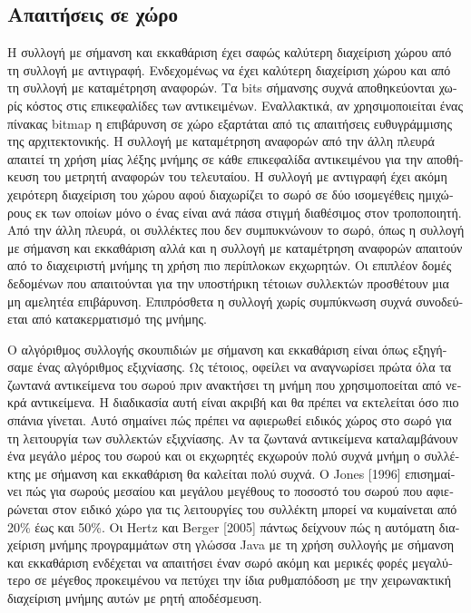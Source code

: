 \begin{greek}
\subsection{Απαιτήσεις σε χώρο}
Η συλλογή με σήμανση και εκκαθάριση έχει σαφώς καλύτερη διαχείριση
χώρου από τη συλλογή με αντιγραφή. Ενδεχομένως να έχει καλύτερη
διαχείριση χώρου και από τη συλλογή με καταμέτρηση αναφορών. Τα
bits σήμανσης συχνά αποθηκεύονται χωρίς κόστος στις επικεφαλίδες
των αντικειμένων. Εναλλακτικά, αν χρησιμοποιείται ένας πίνακας
bitmap η επιβάρυνση σε χώρο εξαρτάται από τις απαιτήσεις ευθυγράμμισης
της αρχιτεκτονικής. Η συλλογή με καταμέτρηση αναφορών από την
άλλη πλευρά απαιτεί τη χρήση μίας λέξης μνήμης σε κάθε επικεφαλίδα
αντικειμένου για την αποθήκευση του μετρητή αναφορών του τελευταίου.
Η συλλογή με αντιγραφή έχει ακόμη χειρότερη διαχείριση του χώρου
αφού διαχωρίζει το σωρό σε δύο ισομεγέθεις ημιχώρους εκ των οποίων
μόνο ο ένας είναι ανά πάσα στιγμή διαθέσιμος στον τροποποιητή.
Από την άλλη πλευρά, οι συλλέκτες που δεν συμπυκνώνουν το σωρό,
όπως η συλλογή με σήμανση και εκκαθάριση αλλά και η συλλογή με
καταμέτρηση αναφορών απαιτούν από το διαχειριστή μνήμης τη χρήση
πιο περίπλοκων εκχωρητών. Οι επιπλέον δομές δεδομένων που απαιτούνται
για την υποστήρικη τέτοιων συλλεκτών προσθέτουν μια μη αμελητέα
επιβάρυνση. Επιπρόσθετα η συλλογή χωρίς συμπύκνωση συχνά συνοδεύεται
από κατακερματισμό της μνήμης.

Ο αλγόριθμος συλλογής σκουπιδιών με σήμανση και εκκαθάριση είναι
όπως εξηγήσαμε ένας αλγόριθμος εξιχνίασης. Ως τέτοιος, οφείλει 
να αναγνωρίσει πρώτα όλα τα ζωντανά αντικείμενα του σωρού πριν
ανακτήσει τη μνήμη που χρησιμοποείται από νεκρά αντικείμενα. 
Η διαδικασία αυτή είναι ακριβή και θα πρέπει να εκτελείται όσο 
πιο σπάνια γίνεται. Αυτό σημαίνει πώς πρέπει να αφιερωθεί ειδικός 
χώρος στο σωρό για τη λειτουργία των συλλεκτών εξιχνίασης. Αν 
τα ζωντανά αντικείμενα καταλαμβάνουν ένα μεγάλο μέρος του σωρού 
και οι εκχωρητές εκχωρούν πολύ συχνά μνήμη ο συλλέκτης με σήμανση 
και εκκαθάριση θα καλείται πολύ συχνά. O Jones [1996] επισημαίνει 
πώς για σωρούς μεσαίου και μεγάλου μεγέθους το ποσοστό του σωρού 
που αφιερώνεται στον ειδικό χώρο για τις λειτουργίες του συλλέκτη 
μπορεί να κυμαίνεται από 20\% έως και 50\%. Οι Hertz και Berger
[2005] \cite{DBLP:conf/oopsla/HertzB05} πάντως δείχνουν πώς
η αυτόματη διαχείριση μνήμης προγραμμάτων στη γλώσσα Java με
τη χρήση συλλογής με σήμανση και εκκαθάριση ενδέχεται να απαιτήσει
έναν σωρό ακόμη και μερικές φορές μεγαλύτερο σε μέγεθος προκειμένου
να πετύχει την ίδια ρυθμαπόδοση με την χειρωνακτική διαχείριση
μνήμης αυτών με ρητή αποδέσμευση.


\end{greek}
